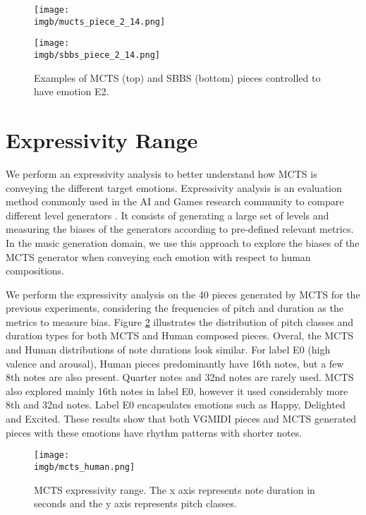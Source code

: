 \begin{figure}[h]
\centering
 \texttt{[image: \\imgb/mucts\_piece\_2\_14.png]}

 \texttt{[image: \\imgb/sbbs\_piece\_2\_14.png]}
 \caption{Examples of MCTS (top) and SBBS (bottom) pieces controlled to have emotion E2.}
 \label{fig:ex_pieces}
\end{figure}

\section{Expressivity Range}

We perform an expressivity analysis to better understand how MCTS is conveying the different target emotions. Expressivity analysis is an evaluation method commonly used in the AI and Games research community to compare different level generators \cite{smith2010analyzing}.  It consists of generating a large set of levels and measuring the biases of the generators according to pre-defined relevant metrics. In the music generation domain,  we use this approach to explore the biases of the MCTS generator when conveying each emotion with respect to human compositions.

We perform the expressivity analysis on the 40 pieces generated by
MCTS for the previous experiments, considering the frequencies of pitch and duration as the metrics to
measure bias. Figure \ref{fig:expressivity} illustrates the distribution of pitch classes and duration types for both MCTS and Human composed pieces. Overal, the MCTS and Human distributions of note durations look similar. For label E0 (high valence and arousal),
Human pieces predominantly have 16th notes, but a few 8th notes are also present. Quarter notes and 32nd notes are rarely used.
MCTS also explored mainly 16th notes in label E0, however it used considerably more 8th and 32nd notes. Label E0 encapsulates emotions such as Happy, Delighted and Excited. These results show that both VGMIDI pieces and MCTS generated pieces with these emotions have rhythm patterns with shorter notes.

\begin{figure}[h]
\centering

 \texttt{[image: \\imgb/mcts\_human.png]}
   \caption{MCTS expressivity range. The x axis represents note duration in seconds and the y axis represents pitch classes. }
 \label{fig:expressivity}
\end{figure}

